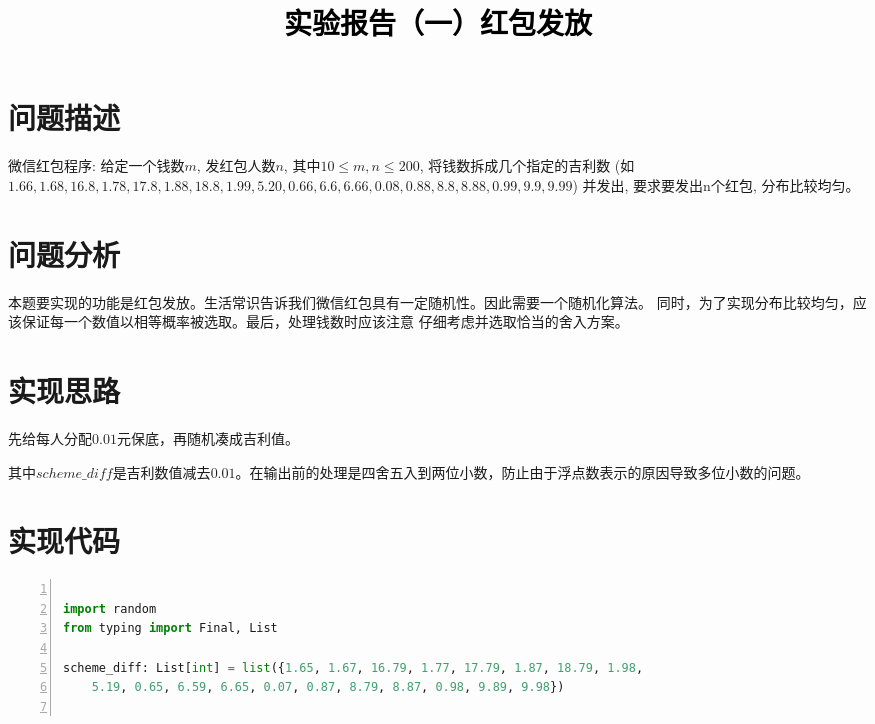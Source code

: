 \documentclass[a4paper,twoside]{article}
\newcommand{\PaperTitle}{实验报告（一）红包发放}  %
\begin{document}
\newpage

\title{
	\Large{\textcolor{black}{\PaperTitle}}
}
	
	
\maketitle
	
\tableofcontents
 
\newpage
\begin{spacing}{1.2}

\section{问题描述}

微信红包程序: 给定一个钱数$m$, 发红包人数$n$, 其中$10 \le m, n \le 200$,
将钱数拆成几个指定的吉利数 (如$1.66,1.68, 16.8,1.78,17.8,1.88,18.8,1.99,5.20,0.66,6.6,6.66,0.08,0.88,8.8,8.88,0.99,9.9,9.99$) 
并发出, 要求要发出n个红包, 分布比较均匀。

\section{问题分析}

本题要实现的功能是红包发放。生活常识告诉我们微信红包具有一定随机性。因此需要一个随机化算法。
同时，为了实现分布比较均匀，应该保证每一个数值以相等概率被选取。最后，处理钱数时应该注意
仔细考虑并选取恰当的舍入方案。

\section{实现思路}

先给每人分配$0.01$元保底，再随机凑成吉利值。

其中$scheme\_diff$是吉利数值减去$0.01$。在输出前的处理是四舍五入到两位小数，防止由于浮点数表示的原因导致多位小数的问题。

\appendix
\section{实现代码}

\begin{lstlisting}[language=Python,numbers=left,style=PythonStyle,caption=红包发放,label={code:redpacket}]
	
import random
from typing import Final, List

scheme_diff: List[int] = list({1.65, 1.67, 16.79, 1.77, 17.79, 1.87, 18.79, 1.98,
	5.19, 0.65, 6.59, 6.65, 0.07, 0.87, 8.79, 8.87, 0.98, 9.89, 9.98})


\end{lstlisting}
\end{spacing}
\end{document}
